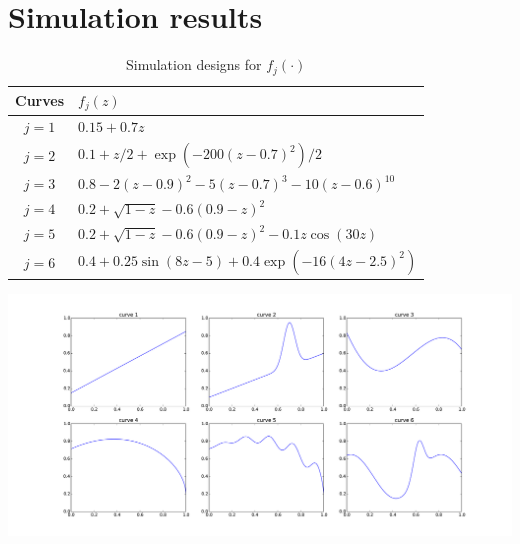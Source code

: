 \documentclass[12pt,oneside,reqno,english]{amsart}
\theoremstyle{definition}
\begin{document}
\section{Simulation results}\label{a:sim}
\begin{table}[H]
\vspace{0.5cm}
\begin{tabular}{cl}
\hline 
Curves & $f_{j}(z)$\tabularnewline
\hline 
\hline 
$j=1$  & $0.15+0.7z$\tabularnewline
$j=2$  & $0.1+z/2+\exp(-200(z-0.7)^{2})/2$\tabularnewline
$j=3$  & $0.8-2(z-0.9)^{2}-5(z-0.7)^{3}-10(z-0.6)^{10}$\tabularnewline
$j=4$  & $0.2+\sqrt{1-z}-0.6(0.9-z)^{2}$\tabularnewline
$j=5$  & $0.2+\sqrt{1-z}-0.6(0.9-z)^{2}-0.1z\cos(30z)$\tabularnewline
$j=6$  & $0.4+0.25\sin(8z-5)+0.4\exp(-16(4z-2.5)^{2})$\tabularnewline
\hline 
\end{tabular}\vspace{2cm}
\begin{center}
\includegraphics[scale=0.35]{curves}
\end{center}
\vspace{0.5cm}
\caption{Simulation designs for $f_{j}(\cdot)$}\label{t:curves}
\end{table}


\newpage{}
\end{document}
